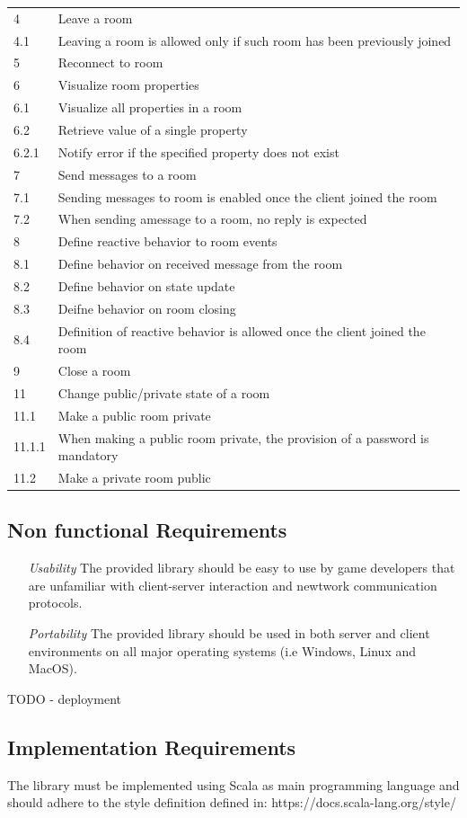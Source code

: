 \begin{center}
\begin{longtable}{|l|l|}
4       & Leave a room \\
4.1     & Leaving a room is allowed only if such room has been previously joined \\
5       & Reconnect to room \\
6       & Visualize room properties \\
6.1     & Visualize all properties in a room \\
6.2     & Retrieve value of a single property \\
6.2.1   & Notify error if the specified property does not exist \\
7       & Send messages to a room \\
7.1     & Sending messages to room is enabled once the client joined the room \\
7.2     & When sending amessage to a room, no reply is expected \\
8       & Define reactive behavior to room events \\
8.1     & Define behavior on received message from the room \\
8.2     & Define behavior on state update \\
8.3     & Deifne behavior on room closing \\
8.4     & Definition of reactive behavior is allowed once the client joined the room \\
9       & Close a room \\
11      & Change public/private state of a room \\
11.1    & Make a public room private \\
11.1.1  & When making a public room private, the provision of a password is mandatory \\ 
11.2    & Make a private room public \\
\hline

  \end{longtable}
\end{center}

\newpage

\subsection{Non functional Requirements} 

\begin{itemize}
	\item[\emph{Usability}] The provided library should be easy to use by game developers that are unfamiliar with client-server interaction and newtwork communication protocols.
	\item[\em{Portability}] The provided library should be used in both server and client environments on all major operating systems (i.e Windows, Linux and MacOS).
\end{itemize}


TODO
- deployment 


\subsection{Implementation Requirements}
The library must be implemented using Scala as main programming language and should adhere to the style definition defined in: https://docs.scala-lang.org/style/
  
 
 

 